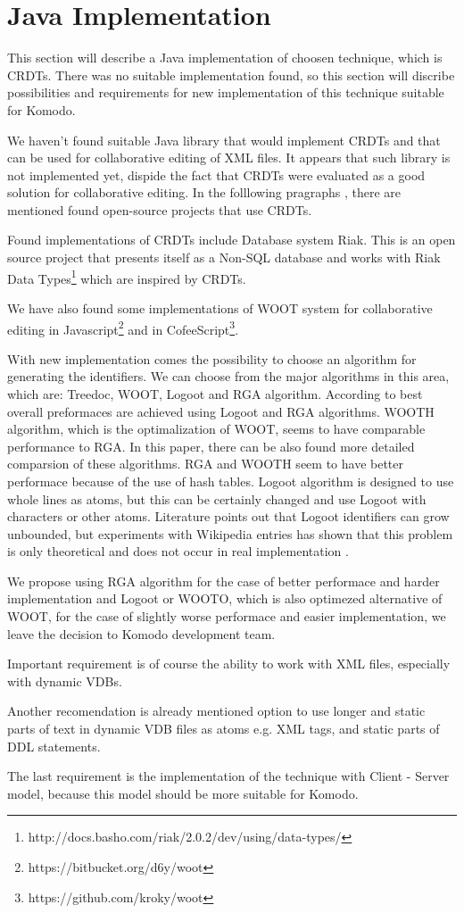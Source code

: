 \documentclass[12pt,oneside]{fithesis2}
\begin{document}
\section{Java Implementation}
\par This section will describe a Java implementation of choosen technique, which is CRDTs. There was no suitable implementation found, so this section will discribe possibilities and requirements for new implementation of this technique suitable for Komodo. 
\par We haven't found suitable Java library that would implement CRDTs and that can be used for collaborative editing of XML files. It appears that such library is not implemented yet, dispide the fact that CRDTs were evaluated as a good solution for collaborative editing. In the folllowing pragraphs , there are mentioned found open-source projects that use CRDTs. 
\par Found implementations of CRDTs include Database system Riak. This is an open source project that presents itself as a Non-SQL database and works with Riak Data Types\footnote{http://docs.basho.com/riak/2.0.2/dev/using/data-types/} which are inspired by CRDTs.
\par We have also found some implementations of WOOT system for collaborative editing in Javascript\footnote{https://bitbucket.org/d6y/woot} and in CofeeScript\footnote{https://github.com/kroky/woot}.
\par With new implementation comes the possibility to choose an algorithm for generating the identifiers. We can choose from the major algorithms in this area, which are: Treedoc, WOOT, Logoot and RGA algorithm. According to \cite{CRDT-real} best overall preformaces are achieved using Logoot and RGA algorithms. WOOTH algorithm, which is the optimalization of WOOT, seems to have comparable performance to RGA. In this paper, there can be also found more detailed comparsion of these algorithms. RGA and WOOTH seem to have better performace because of the use of hash tables. Logoot algorithm is designed to use whole lines as atoms, but this can be certainly changed and use Logoot with characters or other atoms. Literature points out that Logoot identifiers can grow unbounded, but  experiments with Wikipedia entries has shown that this problem is only theoretical and does not occur in real implementation \cite{Logoot2}.
\par We propose using RGA algorithm for the case of better performace and harder implementation and Logoot or WOOTO, which is also optimezed alternative of WOOT, for the case of slightly worse performace and easier implementation, we leave the decision to Komodo development team.
\par Important requirement is of course the ability to work with XML files, especially with dynamic VDBs.
\par Another recomendation is already mentioned option to use longer and static parts of text in dynamic VDB files as atoms e.g. XML tags, and static parts of DDL statements.
\par The last requirement is the implementation of the technique with Client - Server model, because this model should be more suitable for Komodo.
\end{document}
